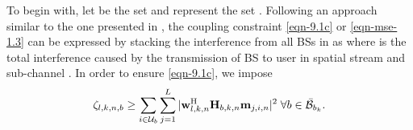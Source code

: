 To begin with, let  be the set  and  represent the set . Following an approach similar to the one presented in \cite{pennanen2011decentralized,tolli2011decentralized}, the coupling constraint \eqref{eqn-9.1c} or \eqref{eqn-mse-1.3} can be 
expressed by stacking the interference from all \acp{BS} in  as
\iftoggle{single_column}{
\begin{equation}\label{eqn-decent-3}
\beta_{l,k,n} \geq \sum_{\substack{j = 1\\j \neq l}}^L |\mvec{w}{l,k,n}^\herm \mvec{H}{b_k,k,n} \mvec{m}{j,k,n} |^2 + \sum_{i \in \mc{U}_{b_k} \backslash \{k\}} \sum_{j = 1}^L |\mvec{w}{l,k,n}^\herm \mvec{H}{b_k,k,n} \mvec{m}{j,i,n} |^2 + \sum_{b \in \bar{\mc{B}}_{b_k}} \zeta_{l,k,n,b} \; + \; \enoise
\end{equation}}{\allowdisplaybreaks
\begin{multline}\label{eqn-decent-3}
\enoise + \sum_{\substack{j = 1,j \neq l}}^L |\mvec{w}{l,k,n}^\herm \mvec{H}{b_k,k,n} \mvec{m}{j,k,n} |^2 + \sum_{b \in \bar{\mc{B}}_{b_k}} \zeta_{l,k,n,b}  \\
+ \sum_{i \in \mc{U}_{b_k} \backslash \{k\}} \sum_{j = 1}^L |\mvec{w}{l,k,n}^\herm \mvec{H}{b_k,k,n} \mvec{m}{j,i,n} |^2 \leq \beta_{l,k,n}
\end{multline}}
where  is the total interference caused by the transmission of \ac{BS}  to user  in spatial stream  and sub-channel . In order to ensure \eqref{eqn-9.1c}, we impose
\begin{equation} \label{inter_exp}
\zeta_{l,k,n,b} \geq \sum_{i \in \mc{U}_b} \sum_{j = 1}^L |\mvec{w}{l,k,n}^\herm \mvec{H}{b,k,n} \mvec{m}{j,i,n} |^2 \; \forall b \in \bar{\mc{B}}_{b_k}.
\end{equation}

